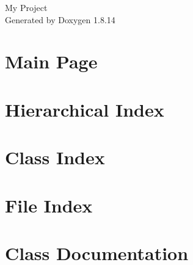 \documentclass[twoside]{book}
\newcommand{\+}{\discretionary{\mbox{\scriptsize$\hookleftarrow$}}{}{}}
\newcommand{\clearemptydoublepage}{%
  \newpage{\pagestyle{empty}\cleardoublepage}%
}
\begin{document}
\hypersetup{pageanchor=false,
             bookmarksnumbered=true,
             pdfencoding=unicode
            }
\begin{titlepage}
\vspace*{7cm}
\begin{center}%
{\Large My Project }\\
\vspace*{1cm}
{\large Generated by Doxygen 1.8.14}\\
\end{center}
\end{titlepage}
\clearemptydoublepage
{}
\tableofcontents
\clearemptydoublepage
{}
\hypersetup{pageanchor=true}

\chapter{Main Page}
\label{index}\hypertarget{index}{}
\chapter{Hierarchical Index}

\chapter{Class Index}

\chapter{File Index}

\chapter{Class Documentation}























\end{document}
